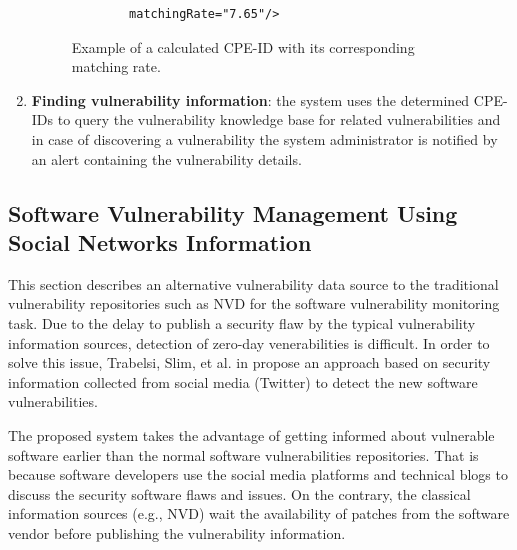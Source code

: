 \documentclass{llncs}
\begin{document}
\begin{enumerate}
\begin{figure}
\begin{lstlisting}
        matchingRate="7.65"/>
       \end{lstlisting}
      \caption{Example of a calculated CPE-ID with its corresponding matching rate.}
       \end{figure}
      
   \item \textbf{Finding vulnerability information}: the system uses the determined CPE-IDs to query the vulnerability knowledge base for related vulnerabilities and in case of discovering a vulnerability  the system administrator is notified by an alert containing the vulnerability details.      
   
 
 \end{enumerate}

\subsection{Software	Vulnerability	Management	Using	Social	Networks	Information	}

\par This section describes an alternative vulnerability data source to the traditional vulnerability repositories such as NVD for the software vulnerability monitoring task. Due to the  delay to publish a security flaw  by the typical vulnerability information sources,  detection of zero-day venerabilities is difficult.  In order to solve this issue,  Trabelsi, Slim, et al. in \cite{paper2} propose an approach based on security information collected from social media (Twitter) to detect the new software vulnerabilities.


\par
The proposed system takes the advantage of getting informed about vulnerable software earlier than the normal software vulnerabilities repositories. That is because software developers use the social media platforms and technical blogs to discuss the security software flaws and issues. On the contrary, the classical information sources (e.g., NVD) wait the availability of patches from the software vendor before publishing the vulnerability information.
\end{document}
